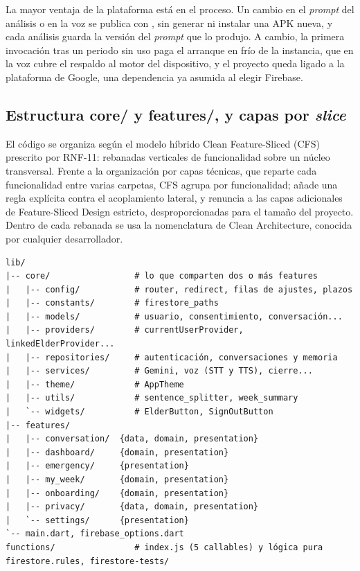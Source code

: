 La mayor ventaja de la plataforma está en el proceso. Un cambio en el \emph{prompt} del análisis o en la voz se publica con , sin generar ni instalar una APK nueva, y cada análisis guarda la versión del \emph{prompt} que lo produjo. A cambio, la primera invocación tras un periodo sin uso paga el arranque en frío de la instancia, que en la voz cubre el respaldo al motor del dispositivo, y el proyecto queda ligado a la plataforma de Google, una dependencia ya asumida al elegir Firebase.

\subsection{Estructura core/ y features/, y capas por \emph{slice}}

El código se organiza según el modelo híbrido Clean Feature-Sliced (CFS) prescrito por RNF-11: rebanadas verticales de funcionalidad sobre un núcleo transversal. Frente a la organización por capas técnicas, que reparte cada funcionalidad entre varias carpetas, CFS agrupa por funcionalidad; añade una regla explícita contra el acoplamiento lateral, y renuncia a las capas adicionales de Feature-Sliced Design estricto, desproporcionadas para el tamaño del proyecto. Dentro de cada rebanada se usa la nomenclatura de Clean Architecture, conocida por cualquier desarrollador.

\begin{lstlisting}[style=Consola, float=!tbp, caption={Estructura real del árbol de código fuente.}, label={lst:arbol}]
lib/
|-- core/                 # lo que comparten dos o más features
|   |-- config/           # router, redirect, filas de ajustes, plazos
|   |-- constants/        # firestore_paths
|   |-- models/           # usuario, consentimiento, conversación...
|   |-- providers/        # currentUserProvider, linkedElderProvider...
|   |-- repositories/     # autenticación, conversaciones y memoria
|   |-- services/         # Gemini, voz (STT y TTS), cierre...
|   |-- theme/            # AppTheme
|   |-- utils/            # sentence_splitter, week_summary
|   `-- widgets/          # ElderButton, SignOutButton
|-- features/
|   |-- conversation/  {data, domain, presentation}
|   |-- dashboard/     {domain, presentation}
|   |-- emergency/     {presentation}
|   |-- my_week/       {domain, presentation}
|   |-- onboarding/    {domain, presentation}
|   |-- privacy/       {data, domain, presentation}
|   `-- settings/      {presentation}
`-- main.dart, firebase_options.dart
functions/                # index.js (5 callables) y lógica pura
firestore.rules, firestore-tests/
\end{lstlisting}

